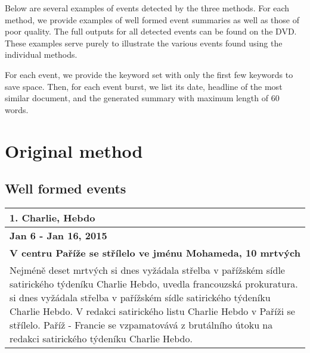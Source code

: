 Below are several examples of events detected by the three methods. For each method, we provide examples of well formed event summaries as well as those of poor quality. The full outputs for all detected events can be found on the DVD. These examples serve purely to illustrate the various events found using the individual methods.

For each event, we provide the keyword set with only the first few keywords to save space. Then, for each event burst, we list its date, headline of the most similar document, and the generated summary with maximum length of 60 words.

\section{Original method}
\subsection*{Well formed events}
\begin{tabularx}{\linewidth}{p{\linewidth}} \toprule[1.5pt]

\bf 1. Charlie, Hebdo \\ \midrule
\bf Jan 6 - Jan 16, 2015 \\ \midrule
\bf V centru Paříže se střílelo ve jménu Mohameda, 10 mrtvých \\
Nejméně deset mrtvých si dnes vyžádala střelba v pařížském sídle satirického týdeníku Charlie Hebdo, uvedla francouzská prokuratura. si dnes vyžádala střelba v pařížském sídle satirického týdeníku Charlie Hebdo. V redakci satirického listu Charlie Hebdo v Paříži se střílelo. Paříž - Francie se vzpamatovává z brutálního útoku na redakci satirického týdeníku Charlie Hebdo. \\ \bottomrule[1.25pt]
\end{tabularx}

\hspace{\fill}

